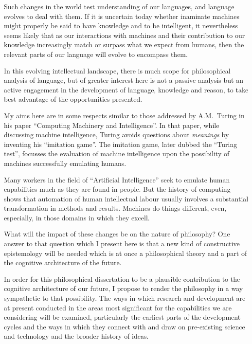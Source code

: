 Such changes in the world test understanding of our languages, and language
evolves to deal with them.
If it is uncertain today whether inaminate machines might properly be said to
have knowledge and to be intelligent, it nevertheless seems likely that as our
interactions with machines and their contribution to our knowledge increasingly
match or surpass what we expect from humans, then the relevant parts of our
language will evolve to encompass them.

In this evolving intellectual landscape, there is much scope for philosophical
analysis of language, but of greater interest here is not a passive analysis but
an active engagement in the development of language, knowledge and reason, to take
best advantage of the opportunities presented.

My aims here are in some respects similar to those addressed by A.M.~Turing
in his paper ``Computing Machinery and Intelligence''.
In that paper, while discussing machine intelligence, Turing avoids questions
about {\it meanings} by inventing his ``imitation game''.
The imitation game, later dubbed the ``Turing test'', focusses the evaluation of
machine intelligence upon the possibility of machines successfully emulating humans.

Many workers in the field of ``Artificial Intelligence'' seek to emulate
human capabilities much as they are found in people.
But the history of computing shows that automation of human intellectual labour
usually involves a substantial transformation in methods and results.
Machines do things different, even, especially, in those domains in which they
excell.

What will the impact of these changes be on the nature of philosophy?
One answer to that question which I present here is that a new kind of
constructive epistemology will be needed which is at once a philosophical
theory and a part of the cognitive architecture of the future.

In order for this philosophical dissertation to be a plausible contribution
to the cognitive architecture of our future, I propose to render the philosophy
in a way sympathetic to that possibility.
The ways in which research and development are at present conducted in the
areas most significant for the capabilities we are considering will be examined,
particularly the earliest parts of the development cycles and the ways in which
they connect with and draw on pre-existing science and technology and the
broader history of ideas.

